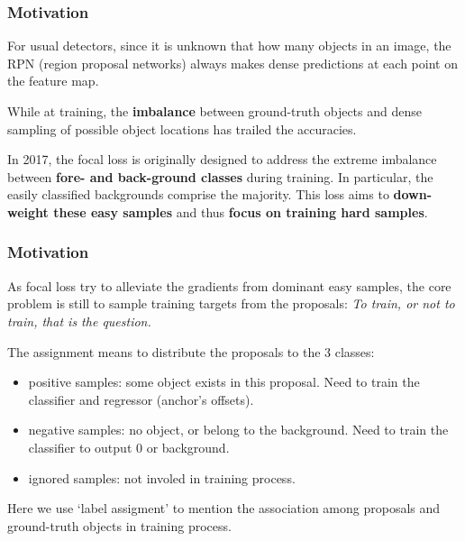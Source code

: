 \documentclass[slidetop, mathserif, dvipsnames]{beamer}
\begin{document}
\begin{frame}
    \frametitle{Motivation}

    For usual detectors, since it is unknown that how many objects in an image,
    the RPN (region proposal networks) always makes dense predictions at each
    point on the feature map.

    \quad

    While at training, the {\bf imbalance} between ground-truth objects and dense
    sampling of possible object locations has trailed the accuracies.

    \quad

    In 2017, the focal loss is originally designed to address the extreme imbalance
    between {\bf fore- and back-ground classes} during training.
    In particular, the easily classified backgrounds comprise the majority.
    This loss aims to 
    {\bf down-weight these easy samples} and thus
    {\bf focus on training hard samples}.
\end{frame}

\begin{frame}
    \frametitle{Motivation}

    As focal loss try to alleviate the gradients from dominant easy samples,
    the core problem is still to sample training targets from the proposals:
    {\it To train, or not to train, that is the question.}

    \quad

    The assignment means to distribute the proposals to the 3 classes:
    \begin{itemize}
        \item positive samples: some object exists in this proposal.
            Need to train the classifier and regressor (anchor's offsets).
        \item negative samples: no object, or belong to the background.
            Need to train the classifier to output 0 or background.
        \item ignored samples: not involed in training process.
    \end{itemize}

    Here we use `label assigment' to mention the association among
    proposals and ground-truth objects in training process.
\end{frame}
\end{document}

